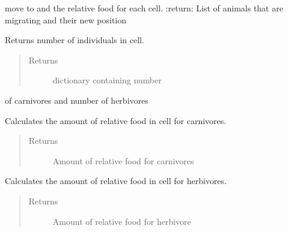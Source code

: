 \documentclass[a4paper,10pt,openany,oneside]{sphinxmanual}
\begin{document}
\begin{fulllineitems}
\begin{fulllineitems}
\begin{quote}
\begin{description}
\end{description}\end{quote}

move to and the relative food for each cell.
:return: List of animals that are migrating and their new position

\end{fulllineitems}


\begin{fulllineitems}
\label{landscape:biosim.landscape.Landscape.number_of_individuals}
Returns number of individuals in cell.
\begin{quote}\begin{description}
\item[{Returns}] \leavevmode
dictionary containing number

\end{description}\end{quote}

of carnivores and number of herbivores

\end{fulllineitems}


\begin{fulllineitems}
\label{landscape:biosim.landscape.Landscape.relative_food_carn}
Calculates the amount of relative food in cell for carnivores.
\begin{quote}\begin{description}
\item[{Returns}] \leavevmode
Amount of relative food for carnivores

\end{description}\end{quote}

\end{fulllineitems}


\begin{fulllineitems}
\label{landscape:biosim.landscape.Landscape.relative_food_herb}
Calculates the amount of relative food in cell for herbivores.
\begin{quote}\begin{description}
\item[{Returns}] \leavevmode
Amount of relative food for herbivore


\end{description}
\end{quote}
\end{fulllineitems}
\end{fulllineitems}
\end{document}
